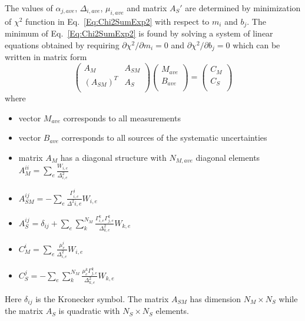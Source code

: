 The values of $\alpha_{j, ave}$, $\Delta_{i,ave}$, $\mu_{i,ave}$ and matrix $A_{S}'$ are determined by minimization of $\chi^2$ function in Eq.~\ref{Eq:Chi2SumExp2} with respect to $m_i$ and $b_j$. The minimum of Eq.~\ref{Eq:Chi2SumExp2} is found by solving a system of linear equations obtained by requiring $\partial \chi^2 / \partial m_i = 0$ and $\partial \chi^2 / \partial b_j = 0$ which can be written in matrix form
\begin{equation}
\begin{pmatrix}
A_M & A_{SM} \\
(A_{SM})^T & A_S \\
\end{pmatrix}
\begin{pmatrix}
M_{ave} \\
B_{ave} \\
\end{pmatrix}
=
\begin{pmatrix}
C_M \\
C_S \\
\end{pmatrix}
\label{Eq:MatrixEQ}
\end{equation}
where
\begin{itemize}
\item vector $M_{ave}$ corresponds to all measurements
\item vector $B_{ave}$ corresponds to all sources of the systematic uncertainties
\item matrix $A_M$ has a diagonal structure with $N_{M,ave}$ diagonal elements $A_{M}^{ii} = \sum_e \frac{W_{i,e}}{\Delta^2_{i,e}}$
\item $A_{SM}^{ij} = - \sum_e \frac{\Gamma^j_{i,e}}{\Delta^2{i,e}} W_{i,e}$
\item $A_S^{ij} = \delta_{ij} + \sum_e \sum_k^{N_M} 
\frac{ \Gamma^k_{i,e} \Gamma^k_{j,e}}{\Delta^2_{k,e}} W_{k,e}$
\item $C_M^i = \sum_e \frac{\mu^i_e}{\Delta^2_{i,e}} W_{i,e} $
\item $C_S^j = -\sum_e \sum_k^{N_M} \frac{\mu^k_e \Gamma^k_{j,e}}{\Delta^2_{k,e}} W_{k,e}$
\end{itemize}
Here $\delta_{ij}$ is the Kronecker symbol. The matrix $A_{SM}$ has dimension $N_M \times N_S$ while the matrix $A_S$ is quadratic with $N_S \times N_S$ elements.

